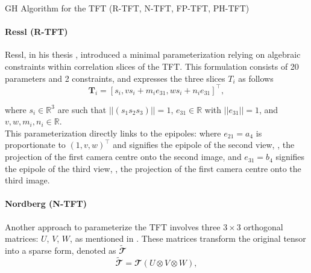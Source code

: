 \begin{algorithm}[h]
		\caption{\acs{GH} Algorithm for the \acs{TFT} (\acs{R-TFT}, \acs{N-TFT}, \acs{FP-TFT}, \acs{PH-TFT})}
\end{algorithm}

\paragraph{Ressl (\acs{R-TFT})}
Ressl, in his thesis \cite{9-ressl-param}, introduced a minimal parameterization relying on algebraic constraints within correlation slices of the \acs{TFT}. This formulation consists of 20 parameters and 2 constraints, and expresses the three slices \( T_i \) as follows
\begin{equation}
	\bm{T}_i = [s_i, vs_i + m_ie_{31}, ws_i + n_ie_{31}]^\top,
\end{equation}

where \( s_i \in \mathbb{R}^3 \) are such that \( || (s_1 s_2 s_3) || = 1 \), \( e_{31} \in \mathbb{R} \) with \( || e_{31} || = 1 \), and \( v, w, m_i, n_i \in \mathbb{R} \).\\

This parameterization directly links to the epipoles: where \( e_{21} = a_4 \) is proportionate to \( (1,v,w)^\top \) and signifies the epipole of the second view, \ie, the projection of the first camera centre onto the second image, and \( e_{31} = b_4 \) signifies the epipole of the third view, \ie, the projection of the first camera centre onto the third image.

\paragraph{Nordberg (\acs{N-TFT})}
Another approach to parameterize the \acs{TFT} involves three \( 3 \times 3 \) orthogonal matrices: \( U \), \( V \), \( W \), as mentioned in \cite{6-nordberg-param}. These matrices transform the original tensor into a sparse form, denoted as \( \bm{\widetilde{\mathbfcal{T}}} \)
\begin{equation}
	\bm{\widetilde{\mathbfcal{T}}} = \mathbfcal{T} (U \otimes V \otimes W),
\end{equation}

